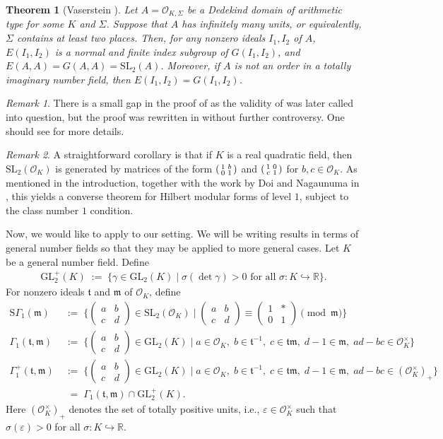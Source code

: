 \documentclass[11pt]{amsart}
\newtheorem{theorem}{Theorem}[section]
\theoremstyle{remark}
\newtheorem*{rmk}{Remark}
\newcommand\m[1]{\begin{pmatrix}#1\end{pmatrix}}
\newcommand\sm[1]{\begin{psmallmatrix}#1\end{psmallmatrix}}
\newcommand\fr[1]{\mathfrak{#1}}
\newcommand{\real}{\mathbb{R}}
\newcommand{\eps}{\varepsilon}
\newcommand{\clo}{\mathcal{O}}
\newcommand{\eq}{\;=\;}
\newcommand{\deq}{\;:=\;}
\newcommand{\GL}{\mathrm{GL}}
\newcommand{\SL}{\mathrm{SL}}
\newcommand{\SG}{\mathrm{S}\Gamma}
\begin{document}
\begin{theorem}[Vaserstein \cite{vaserstein}]
\label{vaserstein}Let $A=\clo_{K,\Sigma}$ be a Dedekind domain of arithmetic type for some $K$ and $\Sigma$. Suppose that $A$ has infinitely many units, or equivalently, $\Sigma$ contains at least two places. Then, for any nonzero ideals $I_1,I_2$ of $A$, $E(I_1,I_2)$ is a normal and finite index subgroup of $G(I_1,I_2)$, and $E(A,A)=G(A,A)=\SL_2(A)$. Moreover, if $A$ is not an order in a totally imaginary number field, then $E(I_1,I_2)=G(I_1,I_2)$.
\end{theorem}
\begin{rmk}
There is a small gap in the proof of  as the validity of \cite[Lemma~3]{vaserstein} was later called into question, but the proof was rewritten in \cite{liehl} without further controversy. One should see \cite{liehl} for more details.
\end{rmk}
\begin{rmk}
A straightforward corollary is that if $K$ is a real quadratic field, then $\SL_2(\clo_K)$ is generated by matrices of the form $\sm{1&b\\0&1}$ and $\sm{1&0\\c&1}$ for \mbox{$b,c\in\clo_K$}. As mentioned in the introduction, together with the work by Doi and Nagaunuma in \cite{doinaganuma}, this yields a converse theorem for Hilbert modular forms of level $1$, subject to the class number $1$ condition.
\end{rmk}

Now, we would like to apply  to our setting. We will be writing results in terms of general number fields so that they may be applied to more general cases. Let $K$ be a general number field. Define
\begin{align*}
    \GL_2^+(K)\deq\{\gamma\in\GL_2(K)\mid\sigma(\det\gamma)>0\text{ for all }\sigma:K\hookrightarrow\real\}.
\end{align*}
For nonzero ideals $\fr{t}$ and $\fr{m}$ of $\clo_K$, define
\begin{align*}
    \SG_1(\fr{m})&\deq\bigg\{\m{a&b\\c&d}\in\SL_2(\clo_K)\;\bigg|\; \m{a&b\\c&d}\equiv\m{1&*\\0&1}\pmod{\fr{m}}\bigg\} \\
    \Gamma_1(\fr{t},\fr{m})&\deq\bigg\{\m{a&b\\c&d}\in\GL_2(K)\;\bigg|\; a\in\clo_K,\;b\in\fr{t}^{-1},\;c\in\fr{t}\fr{m},\;d-1\in\fr{m},\;ad-bc\in\clo_K^\times\bigg\} \\
    \Gamma_1^+(\fr{t},\fr{m})&\deq\bigg\{\m{a&b\\c&d}\in\GL_2(K)\;\bigg|\; a\in\clo_K,\;b\in\fr{t}^{-1},\;c\in\fr{t}\fr{m},\;d-1\in\fr{m},\;ad-bc\in(\clo_K^\times)_+\bigg\}\\
    &\;\eq\Gamma_1(\fr{t},\fr{m})\cap\GL_2^+(K).
\end{align*}
Here $(\clo_K^\times)_+$ denotes the set of totally positive units, i.e., $\eps\in\clo_K^\times$ such that $\sigma(\eps)>0$ for all $\sigma:K\hookrightarrow\real$.
\end{document}
